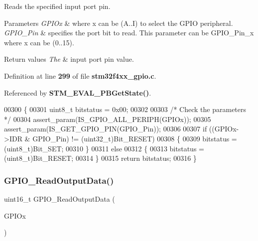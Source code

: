 Reads the specified input port pin. 


\begin{DoxyParams}{Parameters}
{\em G\+P\+I\+Ox} & where x can be (A..I) to select the G\+P\+IO peripheral. \\
\hline
{\em G\+P\+I\+O\+\_\+\+Pin} & specifies the port bit to read. This parameter can be G\+P\+I\+O\+\_\+\+Pin\+\_\+x where x can be (0..15). \\
\hline
\end{DoxyParams}

\begin{DoxyRetVals}{Return values}
{\em The} & input port pin value. \\
\hline
\end{DoxyRetVals}


Definition at line \textbf{ 299} of file \textbf{ stm32f4xx\+\_\+gpio.\+c}.



Referenced by \textbf{ S\+T\+M\+\_\+\+E\+V\+A\+L\+\_\+\+P\+B\+Get\+State()}.


\begin{DoxyCode}
00300 \{
00301   uint8\_t bitstatus = 0x00;
00302 
00303   \textcolor{comment}{/* Check the parameters */}
00304   assert_param(IS_GPIO_ALL_PERIPH(GPIOx));
00305   assert_param(IS_GET_GPIO_PIN(GPIO\_Pin));
00306 
00307   \textcolor{keywordflow}{if} ((GPIOx->IDR & GPIO\_Pin) != (uint32\_t)Bit_RESET)
00308   \{
00309     bitstatus = (uint8\_t)Bit_SET;
00310   \}
00311   \textcolor{keywordflow}{else}
00312   \{
00313     bitstatus = (uint8\_t)Bit\_RESET;
00314   \}
00315   \textcolor{keywordflow}{return} bitstatus;
00316 \}
\end{DoxyCode}
\mbox{\label{group__GPIO__Group2_gaf8938a34280b7dc3e39872a7c17bb323}} 
\subsubsection{G\+P\+I\+O\+\_\+\+Read\+Output\+Data()}
{\footnotesize\ttfamily uint16\+\_\+t G\+P\+I\+O\+\_\+\+Read\+Output\+Data (\begin{DoxyParamCaption}\item[{\textbf{ G\+P\+I\+O\+\_\+\+Type\+Def} $\ast$}]{G\+P\+I\+Ox }\end{DoxyParamCaption})}




